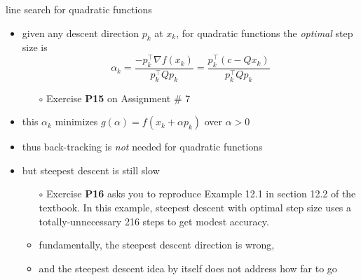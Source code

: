 \documentclass[10pt,hyperref]{beamer}
\newcommand{\grad}{\nabla}
\begin{document}
\begin{frame}{line search for quadratic functions}

\begin{itemize}
\item given any descent direction $p_k$ at $x_k$, for quadratic functions the \emph{optimal} step size is
    $$\alpha_k = \frac{-p_k^\top \grad f(x_k)}{p_k^\top Q p_k} = \frac{p_k^\top (c - Q x_k)}{p_k^\top Q p_k}$$
    \begin{itemize}
    \item[$\circ$] Exercise \textbf{P15} on Assignment \# 7
    \end{itemize}
\item this $\alpha_k$ minimizes $g(\alpha) = f(x_k + \alpha p_k)$ over $\alpha>0$
\item thus back-tracking is \emph{not} needed for quadratic functions

\bigskip
\item \alert{but} steepest descent is still slow
    \begin{itemize}
    \item[$\circ$] Exercise \textbf{P16} asks you to reproduce Example 12.1 in section 12.2 of the textbook.  In this example, steepest descent with optimal step size uses a totally-unnecessary 216 steps to get modest accuracy.
    \item<2>[$\circ$] fundamentally, \alert{the steepest descent direction is wrong},
    \item<2>[$\circ$] and \alert{the steepest descent idea by itself does not address how far to go}
    \end{itemize}

\end{itemize}
\end{frame}
\end{document}
